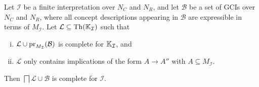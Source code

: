 \begin{Theorem}
  \label{thm:gci-completion-simple-version}
  Let $\mathcal{I}$ be a finite interpretation over $N_C$ and $N_R$, and let $\mathcal{B}$
  be a set of GCIs over $N_C$ and $N_R$, where all concept descriptions appearing in
  $\mathcal{B}$ are expressible in terms of $M_{\mathcal{I}}$.  Let $\mathcal{L} \subseteq
  \operatorname{Th}({\mathbb{K}}_{\mathcal{I}})$ such that
  \begin{enumerate}[i. ]
  \item\label{item:18} $\mathcal{L} \cup \operatorname{pr}_{M_{\mathcal{I}}}(\mathcal{B})$ is complete
    for ${\mathbb{K}}_{\mathcal{I}}$, and
  \item\label{item:19} $\mathcal{L}$ only contains implications of the form $A \to A''$
    with $A \subseteq M_{\mathcal{I}}$.
  \end{enumerate}
  Then $\bigsqcap \mathcal{L} \cup \mathcal{B}$ is complete for $\mathcal{I}$.
\end{Theorem}
